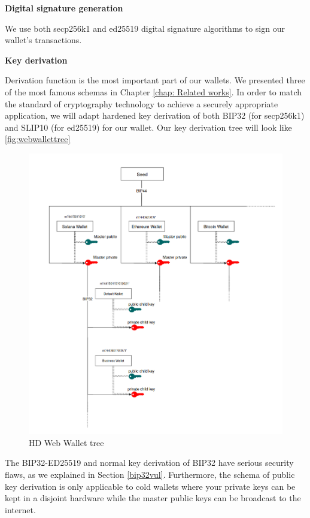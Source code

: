 \bigskip
{\textbf{Digital signature generation}}

We use both secp256k1 and ed25519 digital signature algorithms to sign our wallet’s transactions.

\bigskip
{\textbf{Key derivation}}

Derivation function is the most important part of our wallets. We presented three of the most famous schemas in Chapter \ref{chap: Related works}. In order to match the standard of cryptography technology to achieve a securely appropriate application, we will adapt hardened key derivation of both BIP32 (for secp256k1) and SLIP10 (for ed25519) for our wallet.
Our key derivation tree will look like \autoref{fig:webwallettree}

\begin{figure}[ht!]
    \centering
    \includegraphics[width=1\textwidth]{images/tree_web_wallet.png}
    \caption[HD Web Wallet tree]{HD Web Wallet tree}
    \label{fig:webwallettree}
\end{figure}

The BIP32-ED25519 and normal key derivation of BIP32 have serious security flaws, as we explained in Section \ref{bip32vul}. Furthermore, the schema of public key derivation is only applicable to cold wallets where your private keys can be kept in a disjoint hardware while the master public keys can be broadcast to the internet.


